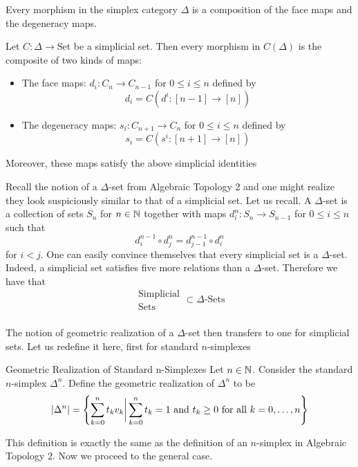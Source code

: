 \documentclass[a4paper]{article}
\begin{document}
\begin{prp}{}{} Every morphism in the simplex category $\Delta$ is a composition of the face maps and the degeneracy maps. 
\end{prp}

\begin{thm}{}{} Let $C:\Delta\to\text{Set}$ be a simplicial set. Then every morphism in $C(\Delta)$ is the composite of two kinds of maps: 
\begin{itemize}
\item The face maps: $d_i:C_n\to C_{n-1}$ for $0\leq i\leq n$ defined by $$d_i=C(d^i:[n-1]\to[n])$$
\item The degeneracy maps: $s_i:C_{n+1}\to C_n$ for $0\leq i\leq n$ defined by $$s_i=C(s^i:[n+1]\to[n])$$
\end{itemize}
Moreover, these maps satisfy the above simplicial identities
\end{thm}

Recall the notion of a $\Delta$-set from Algebraic Topology 2 and one might realize they look suspiciously similar to that of a simplicial set. Let us recall. A $\Delta$-set is a collection of sets $S_n$ for $n\in\mathbb{N}$ together with maps $d_i^n:S_n\to S_{n-1}$ for $0\leq i\leq n$ such that $$d_i^{n-1}\circ d_j^n=d_{j-1}^{n-1}\circ d_i^n$$ for $i<j$. One can easily convince themselves that every simplicial set is a $\Delta$-set. Indeed, a simplicial set satisfies five more relations than a $\Delta$-set. Therefore we have that $$\substack{\text{Simplicial}\\\text{Sets}}\subset\Delta\text{-Sets}$$~\\

The notion of geometric realization of a $\Delta$-set then transfers to one for simplicial sets. Let us redefine it here, first for standard $n$-simplexes

\begin{defn}{Geometric Realization of Standard n-Simplexes}{} Let $n\in\mathbb{N}$. Consider the standard $n$-simplex $\Delta^n$. Define the geometric realization of $\Delta^n$ to be $$\abs{\Delta^n}=\left\{\sum_{k=0}^nt_kv_k\bigg{|}\sum_{k=0}^nt_k=1\text{ and }t_k\geq 0\text{ for all }k=0,\dots,n\right\}$$
\end{defn}

This definition is exactly the same as the definition of an $n$-simplex in Algebraic Topology 2. Now we proceed to the general case. 
\end{document}
